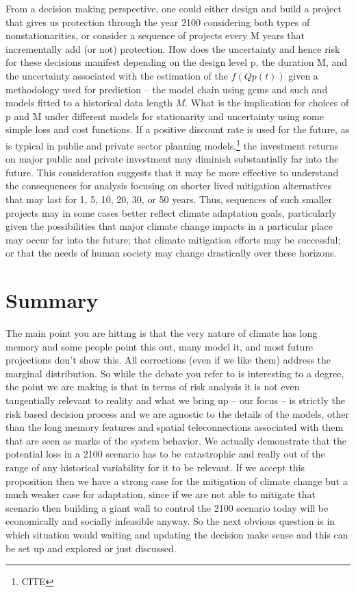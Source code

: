 \documentclass[12pt]{article}
\begin{document}
From a decision making perspective, one could either design and build a project that gives us protection through the year 2100 considering both types of nonstationarities, or consider a sequence of projects every M years that incrementally add (or not) protection. How does the uncertainty and hence risk for these decisions manifest depending on the design level p, the duration M, and the uncertainty associated with the estimation of the \( f(Qp(t)) \) given a methodology used for prediction -- \eg{} the model chain using gcms and such and models fitted to a historical data length $M$.
What is the implication for choices of p and M under different models for stationarity and uncertainty using some simple loss and cost  functions.
If a positive discount rate is used for the future, as is typical in public and private sector planning models,\footnote{CITE} the investment returns on major public and private investment may diminish substantially far into the future.
This consideration suggests that it may be more effective to understand the consequences for analysis focusing on shorter lived mitigation alternatives that may last for 1, 5, 10, 20, 30, or 50 years.
Thus, sequences of such smaller projects may in some cases better reflect climate adaptation goals, particularly given the possibilities that major climate change impacts in a particular place may occur far into the future; that climate mitigation efforts may be successful; or that the needs of human society may change drastically over these horizons.



\section{Summary}

The main point you are hitting is that the very nature of climate has long memory and some people point this out, many model it, and most future projections don't show this.
All corrections (even if we like them) address the marginal distribution.
So while the debate you refer to is interesting to a degree, the point we are making is that in terms of risk analysis it is not even tangentially relevant to reality and what we bring up -- our focus -- is strictly the risk based decision process and we are agnostic to the details of the models, other than the long memory features and spatial teleconnections associated with them that are seen as marks of the system behavior.
We actually demonstrate that the potential loss in a 2100 scenario has to be catastrophic and really out of the range of any historical variability for it to be relevant.
If we accept this proposition then we have a strong case for the mitigation of climate change but a much weaker case for adaptation, since if we are not able to mitigate that scenario then building a giant wall to control the 2100 scenario today will be economically and socially infeasible anyway.
So the next obvious question is in which situation would waiting and updating the decision make sense and this can be set up and explored or just discussed.
\end{document}
